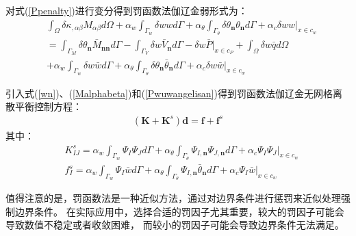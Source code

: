 对式(\ref{Ppenalty})进行变分得到罚函数法伽辽金弱形式为：
\begin{equation}
\begin{split}
    &\int_{\Omega}\delta\kappa_{,\alpha\beta}M_{\alpha\beta}d\Omega
    +\alpha_w\int_{\Gamma_w}\delta wwd\Gamma+\alpha_{\theta}\int_{\Gamma_{\theta}}\delta\theta_{\pmb{n}}\theta_{\pmb{n}}d\Gamma+\alpha_c\delta ww\vert_{x\in c_w}\\
    &=\int_{\Gamma_M}\delta\theta_{\pmb{n}}\bar{M}_{\pmb{nn}}d\Gamma-\int_{\Gamma_V}\delta w\bar{V}_{\pmb{n}}d\Gamma-\delta w\bar{P}\vert_{x\in c_P}+\int_{\Omega}\delta w\bar{q}d\Omega\\
    &+\alpha_w\int_{\Gamma_w}\delta w\bar{w}d\Gamma+\alpha_{\theta}\int_{\Gamma_{\theta}}\delta\theta_{\pmb{n}}\bar{\theta}_{\pmb{n}}d\Gamma+\alpha_c\delta w\bar{w}\vert_{x\in c_w}
\end{split}
\end{equation}\par
引入式(\ref{wn})、(\ref{Malphabeta})和(\ref{Pwuwangelisan})得到罚函数法伽辽金无网格离散平衡控制方程：
\begin{equation}
\begin{split}
    (\pmb{K}+\pmb{K}^s)\pmb{d}=\pmb{f}+\pmb{f}^s
\end{split}
\end{equation}
其中：
\begin{equation}
\begin{split}
   &K^s_{IJ}=\alpha_w\int_{\Gamma_w}\Psi_I\Psi_Jd\Gamma+\alpha_{\theta}\int_{\Gamma_{\theta}}\Psi_{I,\pmb n}\Psi_{J,\pmb n}d\Gamma+\alpha_c\Psi_I\Psi_J\vert_{x\in c_w}\\
&f^s_I=\alpha_w\int_{\Gamma_w}\Psi_I\bar{w}d\Gamma+\alpha_{\theta}\int_{\Gamma_{\theta}}\Psi_{I,\pmb n}\bar{\theta}_{\pmb n}d\Gamma+\alpha_c\Psi_I\bar{w}\vert_{x\in c_w}
\end{split}
\end{equation}\par
值得注意的是，罚函数法是一种近似方法，通过对边界条件进行惩罚来近似处理强制边界条件。
在实际应用中，选择合适的罚因子尤其重要，较大的罚因子可能会导致数值不稳定或者收敛困难，
而较小的罚因子可能会导致边界条件无法满足。
